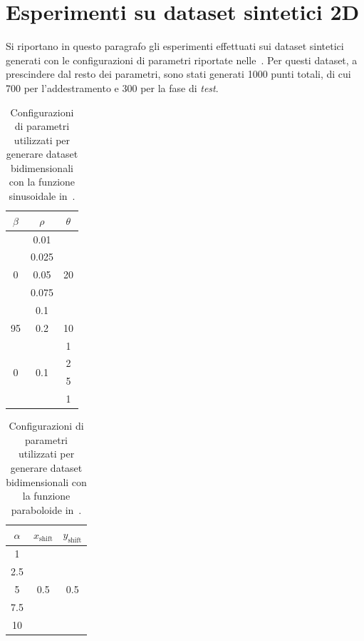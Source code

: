 \section{Esperimenti su dataset sintetici 2D}\label{sec:exp:synth_2d}
Si riportano in questo paragrafo gli esperimenti effettuati sui dataset sintetici generati con le configurazioni di parametri riportate nelle~.
Per questi dataset, a prescindere dal resto dei parametri, sono stati generati 1000 punti totali, di cui 700 per l'addestramento e 300 per la fase di \emph{test}.
\begin{table}
    \centering
    \begin{tabular}{ccc}
        \toprule
        $\beta$ & $\rho$ & $\theta$\\
        \midrule
        \multirow{5}{*}{0}  & 0.01  & \multirow{5}{*}{20} \\        
                            & 0.025 &     \\        
                            & 0.05  &     \\        
                            & 0.075 &     \\        
                            & 0.1   &     \\
        \hline
        95                  & 0.2   & 10    \\   
        \hline
        \multirow{4}{*}{0}  & \multirow{4}{*}{0.1}  & 1     \\    
                            &                       & 2     \\    
                            &                       & 5     \\    
                            &                       & 1     \\    
        \bottomrule
    \end{tabular}
    \caption{Configurazioni di parametri utilizzati per generare dataset bidimensionali con la funzione sinusoidale in~.}
    \label{tab:parametri_ds_sin}
\end{table}
\begin{table}
    \centering
    \begin{tabular}{ccc}
        \toprule
        $\alpha$ & $x_\text{shift}$ & $y_\text{shift}$ \\
        \midrule
        1   & \multirow{5}{*}{0.5} & \multirow{5}{*}{0.5} \\
        2.5 &\\
        5   &\\
        7.5 &\\
        10  &\\
        \bottomrule
    \end{tabular}
    \caption{Configurazioni di parametri utilizzati per generare dataset bidimensionali con la funzione paraboloide in~.}
    \label{tab:parametri_ds_pacman}
\end{table}

